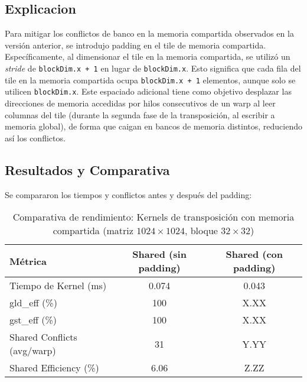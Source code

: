 \documentclass[a4paper,11pt]{article}
\begin{document}
\subsection{Explicacion}
Para mitigar los conflictos de banco en la memoria compartida observados en la versión anterior, se introdujo padding en el tile de memoria compartida. Específicamente, al dimensionar el tile en la memoria compartida, se utilizó un \textit{stride} de \texttt{blockDim.x + 1} en lugar de \texttt{blockDim.x}. Esto significa que cada fila del tile en la memoria compartida ocupa \texttt{blockDim.x + 1} elementos, aunque solo se utilicen \texttt{blockDim.x}. Este espaciado adicional tiene como objetivo desplazar las direcciones de memoria accedidas por hilos consecutivos de un warp al leer columnas del tile (durante la segunda fase de la transposición, al escribir a memoria global), de forma que caigan en bancos de memoria distintos, reduciendo así los conflictos.

\subsection{Resultados y Comparativa}
Se compararon los tiempos y conflictos antes y después del padding:

\begin{table}[H]
\centering
\caption{Comparativa de rendimiento: Kernels de transposición con memoria compartida (matriz $1024 \times 1024$, bloque $32 \times 32$)}
\begin{tabular}{lSS}
\toprule
Métrica & {Shared (sin padding)} & {Shared (con padding)} \\
\midrule
Tiempo de Kernel (ms)       & 0.074  & 0.043  \\
gld\_eff (\%)               & 100    & {X.XX}   \\ %
gst\_eff (\%)               & 100    & {X.XX}   \\ %
Shared Conflicts (avg/warp) & 31     & {Y.YY}   \\ %
Shared Efficiency (\%)      & 6.06   & {Z.ZZ}   \\ %
\bottomrule
\end{tabular}
\label{tab:shared_comparison_padding}
\end{table}
\end{document}
